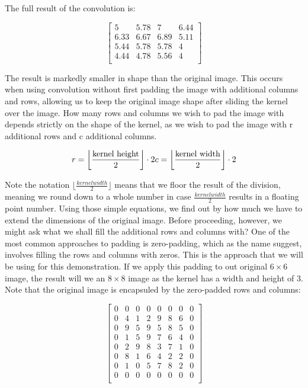\documentclass[onecolumn,10pt,cleanfoot]{asme2ej}
\begin{document}
The full result of the convolution is: 

\begin{equation}
\begin{bmatrix}
5 & 5.78 & 7 & 6.44 \\
6.33 & 6.67 & 6.89 & 5.11 \\
5.44 & 5.78 & 5.78 & 4 \\
4.44 & 4.78 & 5.56 & 4 \\
\end{bmatrix}
\end{equation}

The result is markedly smaller in shape than the original image. This occurs when using convolution without first padding the image with additional columns and rows, allowing us to keep the original image shape after sliding the kernel over the image. How many rows and columns we wish to pad the image with depends strictly on the shape of the kernel, as we wish to pad the image with r additional rows and c additional columns.

\begin{equation}
r = \left\lfloor \frac{{\text{{kernel height}}}}{2} \right\rfloor \cdot 2 \\
c = \left\lfloor \frac{{\text{{kernel width}}}}{2} \right\rfloor \cdot 2
\end{equation}

Note the notation $\lfloor \frac{kernel width}{2} \rfloor$ means that we floor the result of the division, meaning we round down to a whole number in case $\frac{kernel width}{2}$ results in a floating point number.
Using those simple equations, we find out by how much we have to extend the dimensions of the original image. Before proceeding, however, we might ask what we shall fill the additional rows and columns with? One of the most common approaches to padding is zero-padding, which as the name suggest, involves filling the rows and columns with zeros. This is the approach that we will be using for this demonstration. If we apply this padding to out original $6 \times 6$ image, the result will we an $8 \times 8$ image as the kernel has a width and height of 3. Note that the original image is encapsuled by the zero-padded rows and columns:

\begin{equation}
\begin{bmatrix}
0 & 0 & 0 & 0 & 0 & 0 & 0 & 0 \\
0 & 4 & 1 & 2 & 9 & 8 & 6 & 0 \\
0 & 9 & 5 & 9 & 5 & 8 & 5 & 0 \\
0 & 1 & 5 & 9 & 7 & 6 & 4 & 0 \\
0 & 2 & 9 & 8 & 3 & 7 & 1 & 0 \\
0 & 8 & 1 & 6 & 4 & 2 & 2 & 0 \\
0 & 1 & 0 & 5 & 7 & 8 & 2 & 0 \\
0 & 0 & 0 & 0 & 0 & 0 & 0 & 0 \\
\end{bmatrix}
\end{equation}
\end{document}
